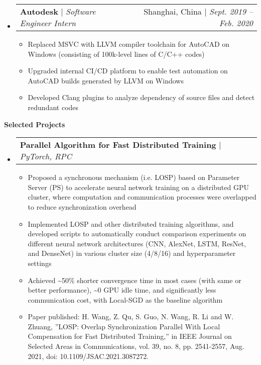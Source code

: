 \documentclass[letterpaper,10pt]{article}[leftmargin=*]
\makeatletter
\def \entryspacing {-0pt}
\newcommand{\mycolortext}[1]{{\color{secondary}#1}}
\renewcommand{\section}[2]{
  \vspace{4pt}
  {
    \color{secondary}\large\textbf{{#1}{\hspace{4pt}#2}}
    \hrulefill
  }
  \vspace{-2pt}
}
\newcommand{\resumeEntryStart}{\begin{itemize}[leftmargin=0mm]}
\newcommand{\resumeEntryEnd}{\end{itemize}\vspace{\entryspacing}}
\newcommand{\resumeItemListStart}{\begin{itemize}[leftmargin=6mm,before=\setlength{\rightmargin}{3pt}]}
\newcommand{\resumeItemListEnd}{\end{itemize}}
\newcommand{\resumeItem}[1]{
  \item\small{
    {#1 \vspace{-1pt}}
  }
}
\newcommand{\resumeEntryMyOneLineTSDL}[4]{
  \vspace{-1pt}\item[]
    \begin{tabularx}{0.995\textwidth}{X@{\hspace{60pt}}r}
      {\textbf{\color{primary}#1} $|$ \color{accent}\small\emph{#3}} & {\firabook\color{accent}\small#4 $|$ \textit{\color{accent}\small#2}} \\
    \end{tabularx}\vspace{-6pt}
}
\newcommand{\resumeEntryMyTD}[3]{
  \vspace{-1pt}\item[]
    \begin{tabularx}{0.97\textwidth}{X@{\hspace{60pt}}r}
      {\textbf{\color{primary}#1} $|$ {\color{accent}\small{\emph{#2}}}} & {\firabook\color{accent}\small#3} \\
    \end{tabularx}\vspace{-6pt}
}
\makeatother
\begin{document}
  \vspace{-6pt}

  \resumeEntryStart
    \resumeEntryMyOneLineTSDL
      {Autodesk}{Sept. 2019 -- Feb. 2020}
      {Software Engineer Intern}{Shanghai, China}
    \resumeItemListStart
      \resumeItem{Replaced MSVC with \mycolortext{LLVM compiler toolchain} for AutoCAD on Windows (consisting of \mycolortext{100k}-level lines of C/C++ codes)}
      \resumeItem{Upgraded internal \mycolortext{CI/CD platform} to enable \mycolortext{test automation} on AutoCAD builds generated by LLVM on Windows}
      \resumeItem{Developed \mycolortext{Clang plugins} to analyze dependency of source files and detect redundant codes}
    \resumeItemListEnd
  \resumeEntryEnd
  

\section{\faCubes}{Selected Projects}

  \resumeEntryStart
    \resumeEntryMyTD
      {Parallel Algorithm for Fast Distributed Training}{PyTorch, RPC}{}
    \resumeItemListStart
      \resumeItem
        {Proposed a \mycolortext{synchronous mechanism} (i.e. LOSP) based on Parameter Server (PS) to \mycolortext{accelerate neural network training} on a \mycolortext{distributed GPU cluster}, where computation and communication processes were overlapped to reduce synchronization overhead}
      \resumeItem
        {Implemented LOSP and other distributed training algorithms, and developed scripts to automatically conduct comparison experiments on different neural network architectures (CNN, AlexNet, LSTM, ResNet, and DenseNet) in various cluster size (4/8/16) and hyperparameter settings}
      \resumeItem
        {Achieved \mycolortext{\textasciitilde 50\% shorter convergence time} in most cases (with same or better performance), \mycolortext{\textasciitilde 0 GPU idle time}, and significantly less communication cost, with Local-SGD as the baseline algorithm}
      \resumeItem
        {Paper published: H. Wang, Z. Qu, S. Guo, N. Wang, R. Li and W. Zhuang, ”LOSP: Overlap Synchronization Parallel With Local Compensation for Fast Distributed Training,” in IEEE Journal on Selected Areas in Communications, vol. 39, no. 8, pp. 2541-2557, Aug. 2021, doi: 10.1109/JSAC.2021.3087272.}
    \resumeItemListEnd
  \resumeEntryEnd
  
  \vspace{-6pt}
  
\end{document}
